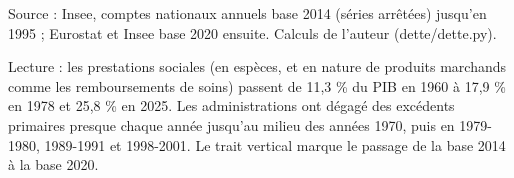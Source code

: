 Source : Insee, comptes nationaux annuels base 2014 (séries arrêtées) jusqu'en 1995 ; Eurostat et Insee base 2020 ensuite. Calculs de l'auteur (dette/dette.py).\par Lecture : les prestations sociales (en espèces, et en nature de produits marchands comme les remboursements de soins) passent de 11,3 \% du PIB en 1960 à 17,9 \% en 1978 et 25,8 \% en 2025. Les administrations ont dégagé des excédents primaires presque chaque année jusqu'au milieu des années 1970, puis en 1979-1980, 1989-1991 et 1998-2001. Le trait vertical marque le passage de la base 2014 à la base 2020.

